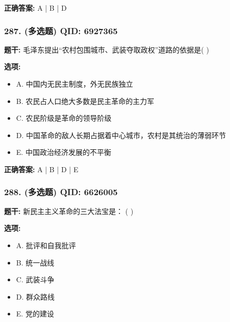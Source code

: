 \documentclass[12pt,UTF8]{ctexart}
\begin{document}
\textbf{正确答案:}
A | B | D

\vspace{0.3em}\hrulefill\vspace{0.7em}

\subsubsection*{287. (多选题) \small QID: 6927365}

\textbf{题干:}
毛泽东提出“农村包围城市、武装夺取政权”道路的依据是(   )

\textbf{选项:}
\begin{itemize}[leftmargin=*]

  \item A. 中国内无民主制度，外无民族独立

  \item B. 农民占人口绝大多数是民主革命的主力军

  \item C. 农民阶级是革命的领导阶级

  \item D. 中国革命的敌人长期占据着中心城市，农村是其统治的薄弱环节

  \item E. 中国政治经济发展的不平衡

\end{itemize}

\textbf{正确答案:}
A | B | D | E

\vspace{0.3em}\hrulefill\vspace{0.7em}

\subsubsection*{288. (多选题) \small QID: 6626005}

\textbf{题干:}
新民主主义革命的三大法宝是： ( )

\textbf{选项:}
\begin{itemize}[leftmargin=*]

  \item A. 批评和自我批评

  \item B. 统一战线

  \item C. 武装斗争

  \item D. 群众路线

  \item E. 党的建设

\end{itemize}
\end{document}
